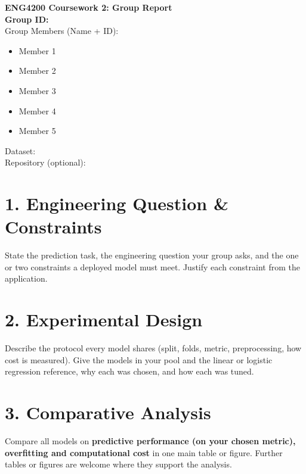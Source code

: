 \documentclass[11pt,a4paper]{article}
\begin{document}
\begin{center}
    {\LARGE \textbf{ENG4200 Coursework 2: Group Report}}\\[0.5em]
    \textbf{Group ID:} \underline{\hspace{3cm}} \\[0.5em]
    Group Members (Name + ID):
    \begin{itemize}
        \item Member 1
        \item Member 2
        \item Member 3
        \item Member 4
        \item Member 5
    \end{itemize}
    Dataset: \underline{\hspace{6cm}} \\[0.5em]
    Repository (optional): \underline{\hspace{6cm}}
\end{center}

\vspace{1em}

\section*{1. Engineering Question \& Constraints}
State the prediction task, the engineering question your group asks, and the one or two constraints a deployed model must meet. Justify each constraint from the application.

\section*{2. Experimental Design}
Describe the protocol every model shares (split, folds, metric, preprocessing, how cost is measured). Give the models in your pool and the linear or logistic regression reference, why each was chosen, and how each was tuned.

\section*{3. Comparative Analysis}
Compare all models on \textbf{predictive performance (on your chosen metric), overfitting and computational cost} in one main table or figure. Further tables or figures are welcome where they support the analysis.
\begin{center}
\end{center}
\end{document}
